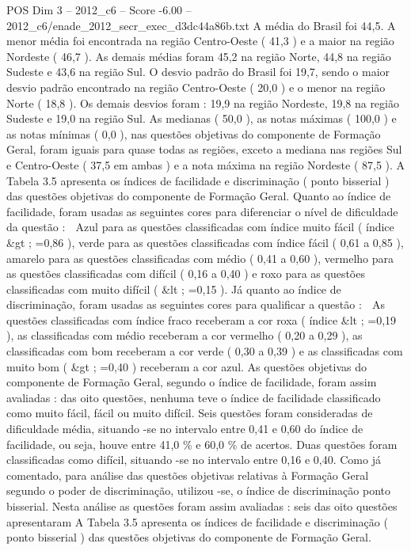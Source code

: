 \begin{textsample}{POS Dim 3 – 2012\_c6 – Score -6.00 – 2012\_c6/enade\_2012\_secr\_exec\_d3dc44a86b.txt}
A média do Brasil foi 44,5.
A menor média foi encontrada na região Centro-Oeste ( 41,3 ) e a maior na região Nordeste ( 46,7 ).
As demais médias foram 45,2 na região Norte, 44,8 na região Sudeste e 43,6 na região Sul.
O desvio padrão do Brasil foi 19,7, sendo o maior desvio padrão encontrado na região Centro-Oeste ( 20,0 ) e o menor na região Norte ( 18,8 ).
Os demais desvios foram : 19,9 na região Nordeste, 19,8 na região Sudeste e 19,0 na região Sul.
As medianas ( 50,0 ), as notas máximas ( 100,0 ) e as notas mínimas ( 0,0 ), nas questões objetivas do componente de Formação Geral, foram iguais para quase todas as regiões, exceto a mediana nas regiões Sul e Centro-Oeste ( 37,5 em ambas ) e a nota máxima na região Nordeste ( 87,5 ).
A Tabela 3.5 apresenta os índices de facilidade e discriminação ( ponto bisserial ) das questões objetivas do componente de Formação Geral.
Quanto ao índice de facilidade, foram usadas as seguintes cores para diferenciar o nível de dificuldade da questão :  Azul para as questões classificadas com índice muito fácil ( índice \&gt ; =0,86 ), verde para as questões classificadas com índice fácil ( 0,61 a 0,85 ), amarelo para as questões classificadas com médio ( 0,41 a 0,60 ), vermelho para as questões classificadas com difícil ( 0,16 a 0,40 ) e roxo para as questões classificadas com muito difícil ( \&lt ; =0,15 ).
Já quanto ao índice de discriminação, foram usadas as seguintes cores para qualificar a questão :  As questões classificadas com índice fraco receberam a cor roxa ( índice \&lt ; =0,19 ), as classificadas com médio receberam a cor vermelho ( 0,20 a 0,29 ), as classificadas com bom receberam a cor verde ( 0,30 a 0,39 ) e as classificadas com muito bom ( \&gt ; =0,40 ) receberam a cor azul.
As questões objetivas do componente de Formação Geral, segundo o índice de facilidade, foram assim avaliadas : das oito questões, nenhuma teve o índice de facilidade classificado como muito fácil, fácil ou muito difícil.
Seis questões foram consideradas de dificuldade média, situando -se no intervalo entre 0,41 e 0,60 do índice de facilidade, ou seja, houve entre 41,0 \% e 60,0 \% de acertos.
Duas questões foram classificadas como difícil, situando -se no intervalo entre 0,16 e 0,40.
Como já comentado, para análise das questões objetivas relativas à Formação Geral segundo o poder de discriminação, utilizou -se, o índice de discriminação ponto bisserial.
Nesta análise as questões foram assim avaliadas : seis das oito questões apresentaram A Tabela 3.5 apresenta os índices de facilidade e discriminação ( ponto bisserial ) das questões objetivas do componente de Formação Geral.

\end{textsample}
